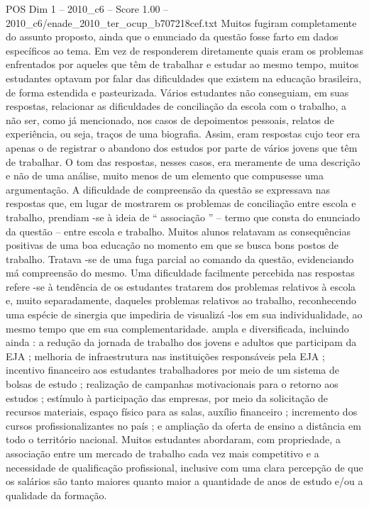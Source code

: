 \begin{textsample}{POS Dim 1 – 2010\_c6 – Score 1.00 – 2010\_c6/enade\_2010\_ter\_ocup\_b707218cef.txt}
Muitos fugiram completamente do assunto proposto, ainda que o enunciado da questão fosse farto em dados específicos ao tema.
Em vez de responderem diretamente quais eram os problemas enfrentados por aqueles que têm de trabalhar e estudar ao mesmo tempo, muitos estudantes optavam por falar das dificuldades que existem na educação brasileira, de forma estendida e pasteurizada.
Vários estudantes não conseguiam, em suas respostas, relacionar as dificuldades de conciliação da escola com o trabalho, a não ser, como já mencionado, nos casos de depoimentos pessoais, relatos de experiência, ou seja, traços de uma biografia.
Assim, eram respostas cujo teor era apenas o de registrar o abandono dos estudos por parte de vários jovens que têm de trabalhar.
O tom das respostas, nesses casos, era meramente de uma descrição e não de uma análise, muito menos de um elemento que compusesse uma argumentação.
A dificuldade de compreensão da questão se expressava nas respostas que, em lugar de mostrarem os problemas de conciliação entre escola e trabalho, prendiam -se à ideia de “ associação ” – termo que consta do enunciado da questão – entre escola e trabalho.
Muitos alunos relatavam as consequências positivas de uma boa educação no momento em que se busca bons postos de trabalho.
Tratava -se de uma fuga parcial ao comando da questão, evidenciando má compreensão do mesmo.
Uma dificuldade facilmente percebida nas respostas refere -se à tendência de os estudantes tratarem dos problemas relativos à escola e, muito separadamente, daqueles problemas relativos ao trabalho, reconhecendo uma espécie de sinergia que impediria de visualizá -los em sua individualidade, ao mesmo tempo que em sua complementaridade. ampla e diversificada, incluindo ainda : a redução da jornada de trabalho dos jovens e adultos que participam da EJA ; melhoria de infraestrutura nas instituições responsáveis pela EJA ; incentivo financeiro aos estudantes trabalhadores por meio de um sistema de bolsas de estudo ; realização de campanhas motivacionais para o retorno aos estudos ; estímulo à participação das empresas, por meio da solicitação de recursos materiais, espaço físico para as salas, auxílio financeiro ; incremento dos cursos profissionalizantes no país ; e ampliação da oferta de ensino a distância em todo o território nacional.
Muitos estudantes abordaram, com propriedade, a associação entre um mercado de trabalho cada vez mais competitivo e a necessidade de qualificação profissional, inclusive com uma clara percepção de que os salários são tanto maiores quanto maior a quantidade de anos de estudo e/ou a qualidade da formação.

\end{textsample}
